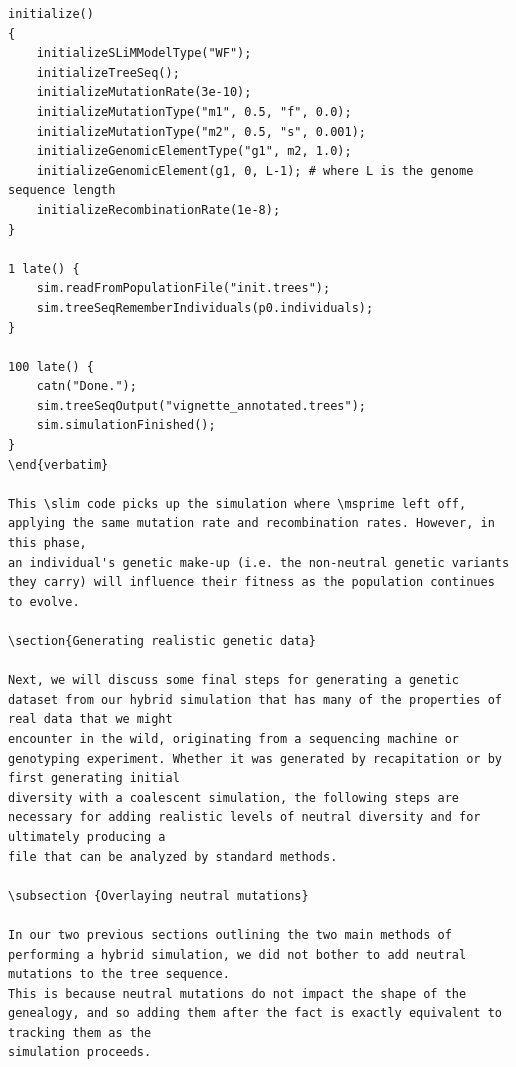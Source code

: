 \documentclass[12pt]{article}
\newcommand{\msprime}[0]{\texttt{msprime}\xspace}
\newcommand{\slim}[0]{\texttt{SLiM}\xspace}
\begin{document}
\begin{lstlisting}[language=slim]
initialize()
{
    initializeSLiMModelType("WF");
    initializeTreeSeq();
    initializeMutationRate(3e-10);
    initializeMutationType("m1", 0.5, "f", 0.0);
    initializeMutationType("m2", 0.5, "s", 0.001);
    initializeGenomicElementType("g1", m2, 1.0);
    initializeGenomicElement(g1, 0, L-1); # where L is the genome sequence length
    initializeRecombinationRate(1e-8);
}

1 late() { 
    sim.readFromPopulationFile("init.trees");
    sim.treeSeqRememberIndividuals(p0.individuals);
}

100 late() {
    catn("Done.");
    sim.treeSeqOutput("vignette_annotated.trees");
    sim.simulationFinished();
}
\end{verbatim}

This \slim code picks up the simulation where \msprime left off, applying the same mutation rate and recombination rates. However, in this phase,
an individual's genetic make-up (i.e. the non-neutral genetic variants they carry) will influence their fitness as the population continues to evolve.

\section{Generating realistic genetic data}

Next, we will discuss some final steps for generating a genetic dataset from our hybrid simulation that has many of the properties of real data that we might
encounter in the wild, originating from a sequencing machine or genotyping experiment. Whether it was generated by recapitation or by first generating initial
diversity with a coalescent simulation, the following steps are necessary for adding realistic levels of neutral diversity and for ultimately producing a
file that can be analyzed by standard methods.

\subsection {Overlaying neutral mutations}

In our two previous sections outlining the two main methods of performing a hybrid simulation, we did not bother to add neutral mutations to the tree sequence.
This is because neutral mutations do not impact the shape of the genealogy, and so adding them after the fact is exactly equivalent to tracking them as the
simulation proceeds.


\end{lstlisting}
\end{document}
